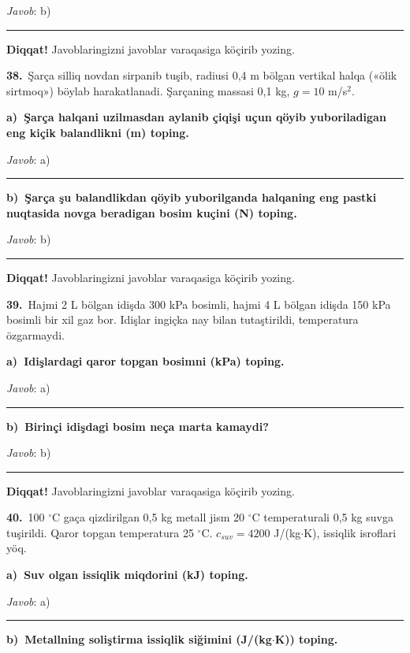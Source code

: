 \documentclass[11pt,a4paper]{article}
\newcommand{\blank}{\rule{5cm}{0.4pt}}
\begin{document}
\noindent\textit{Javob}: b)\ \blank\par
\medskip\noindent\textbf{Diqqat!} Javoblaringizni javoblar varaqasiga köçirib yozing.\par\vspace{10pt}
\noindent\textbf{38.}\ Şarça silliq novdan sirpanib tuşib, radiusi 0,4 m bölgan vertikal halqa («ölik sirtmoq») böylab harakatlanadi. Şarçaning massasi 0,1 kg, $g=10$ m/s$^2$.\par\smallskip
\medskip\noindent\textbf{a)\ Şarça halqani uzilmasdan aylanib çiqişi uçun qöyib yuboriladigan eng kiçik balandlikni (m) toping.}\par
\noindent\textit{Javob}: a)\ \blank\par
\medskip\noindent\textbf{b)\ Şarça şu balandlikdan qöyib yuborilganda halqaning eng pastki nuqtasida novga beradigan bosim kuçini (N) toping.}\par
\noindent\textit{Javob}: b)\ \blank\par
\medskip\noindent\textbf{Diqqat!} Javoblaringizni javoblar varaqasiga köçirib yozing.\par\vspace{10pt}
\noindent\textbf{39.}\ Hajmi 2 L bölgan idişda 300 kPa bosimli, hajmi 4 L bölgan idişda 150 kPa bosimli bir xil gaz bor. Idişlar ingiçka nay bilan tutaştirildi, temperatura özgarmaydi.\par\smallskip
\medskip\noindent\textbf{a)\ Idişlardagi qaror topgan bosimni (kPa) toping.}\par
\noindent\textit{Javob}: a)\ \blank\par
\medskip\noindent\textbf{b)\ Birinçi idişdagi bosim neça marta kamaydi?}\par
\noindent\textit{Javob}: b)\ \blank\par
\medskip\noindent\textbf{Diqqat!} Javoblaringizni javoblar varaqasiga köçirib yozing.\par\vspace{10pt}
\noindent\textbf{40.}\ 100 $^\circ$C gaça qizdirilgan 0,5 kg metall jism 20 $^\circ$C temperaturali 0,5 kg suvga tuşirildi. Qaror topgan temperatura 25 $^\circ$C. $c_{suv}=4200$ J/(kg$\cdot$K), issiqlik isroflari yöq.\par\smallskip
\medskip\noindent\textbf{a)\ Suv olgan issiqlik miqdorini (kJ) toping.}\par
\noindent\textit{Javob}: a)\ \blank\par
\medskip\noindent\textbf{b)\ Metallning soliştirma issiqlik siğimini (J/(kg$\cdot$K)) toping.}\par
\end{document}
